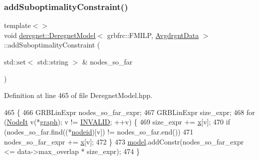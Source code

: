 \subsubsection{\texorpdfstring{add\+Suboptimality\+Constraint()}{addSuboptimalityConstraint()}\hspace{0.1cm}{\footnotesize\ttfamily [3/3]}}
{\footnotesize\ttfamily template$<$$>$ \\
void \hyperlink{classderegnet_1_1DeregnetModel}{deregnet\+::\+Deregnet\+Model}$<$ grbfrc\+::\+F\+M\+I\+LP, \hyperlink{classderegnet_1_1AvgdrgntData}{Avgdrgnt\+Data} $>$\+::add\+Suboptimality\+Constraint (\begin{DoxyParamCaption}\item[{std\+::set$<$ std\+::string $>$ \&}]{nodes\+\_\+so\+\_\+far }\end{DoxyParamCaption})\hspace{0.3cm}{\ttfamily [inline]}}



Definition at line 465 of file Deregnet\+Model.\+hpp.


\begin{DoxyCode}
465                                                                                                          \{
466     GRBLinExpr nodes\_so\_far\_expr;
467     GRBLinExpr size\_expr;
468     \textcolor{keywordflow}{for} (\hyperlink{namespacederegnet_ac34314e1b5f456fc6d1bb9d96316de4a}{NodeIt} v(*\hyperlink{classderegnet_1_1DeregnetModel_a3cd2f54b8e061ef5bed32708d9bc1ef1}{graph}); v != \hyperlink{usinglemon_8hpp_adf770fe2eec438e3758ffe905dbae208}{INVALID}; ++v) \{
469         size\_expr += \hyperlink{classderegnet_1_1DeregnetModel_a360c980f3fec4dfbab50e9bb06a933a8}{x}[v];
470         \textcolor{keywordflow}{if} (nodes\_so\_far.find((*\hyperlink{classderegnet_1_1DeregnetModel_adfebf6f9983c9ccc934469a79381fb78}{nodeid})[v]) != nodes\_so\_far.end())
471             nodes\_so\_far\_expr += \hyperlink{classderegnet_1_1DeregnetModel_a360c980f3fec4dfbab50e9bb06a933a8}{x}[v];
472     \}
473     \hyperlink{classderegnet_1_1DeregnetModel_a30d525de2086e342b33fe3e45ede4947}{model}.addConstr(nodes\_so\_far\_expr <= data->max\_overlap * size\_expr);
474 \}
\end{DoxyCode}
\mbox{\label{classderegnet_1_1DeregnetModel_aee4a0d40a616c0e6e8787dcca08637aa}} 
